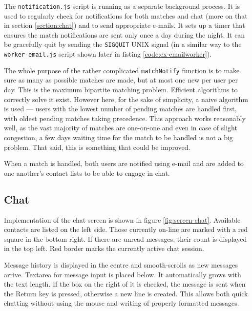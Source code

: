 \documentclass[12pt,oneside]{fithesis}
\begin{document}
		The \texttt{notification.js} script is running as a separate background process. It is used to regularly check for notifications for both matches and chat (more on that in section \ref{section:chat}) and to send appropriate e-mails. It sets up a timer that ensures the match notifications are sent only once a day during the night. It can be gracefully quit by sending the \texttt{SIGQUIT} UNIX signal (in a similar way to the \texttt{worker-email.js} script shown later in listing \ref{code:ex-emailworker}).
		
		The whole purpose of the rather complicated \texttt{matchNotify} function is to make sure as many as possible matches are made, but at most one new per user per day. This is the maximum bipartite matching problem. Efficient algorithms to correctly solve it exist. \cite{Galil1986} However here, for the sake of simplicity, a naive algorithm is used --- users with the lowest number of pending matches are handled first, with oldest pending matches taking precedence. This approach works reasonably well, as the vast majority of matches are one-on-one and even in case of slight congestion, a few days waiting time for the match to be handled is not a big problem. That said, this is something that could be improved.
		
		When a match is handled, both users are notified using e-mail and are added to one another's contact lists to be able to engage in chat.
	\subsection{Chat}
		Implementation of the chat screen is shown in figure \ref{fig:screen-chat}.	Available contacts are listed on the left side. Those currently on-line are marked with a red square in the bottom right. If there are unread messages, their count is displayed in the top left. Red border marks the currently active chat session.
		
		Message history is displayed in the centre and smooth-scrolls as new messages arrive. Textarea for message input is placed below. It automatically grows with the text length. If the box on the right of it is checked, the message is sent when the Return key is pressed, otherwise a new line is created. This allows both quick chatting without using the mouse and writing of properly formatted messages.
	
\end{document}
